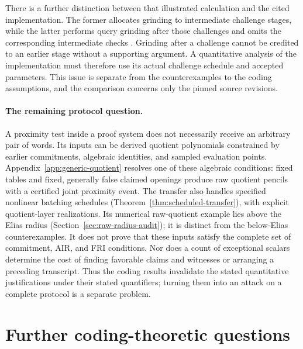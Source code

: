 \documentclass[11pt,letterpaper]{article}
\theoremstyle{definition}
\theoremstyle{remark}
\begin{document}
There is a further distinction between that illustrated calculation
and the cited implementation. The former allocates grinding to
intermediate challenge stages, while the latter performs query grinding
after those challenges and omits the corresponding intermediate checks
\cite{stwo-grinding}. Grinding after a challenge cannot be credited to
an earlier stage without a supporting argument. A quantitative analysis
of the implementation must therefore use its actual challenge schedule
and accepted parameters. This issue is separate from the counterexamples
to the coding assumptions, and the comparison concerns only the pinned
source revisions.

\paragraph{The remaining protocol question.}
A proximity test inside a proof system does not necessarily receive
an arbitrary pair of words. Its inputs can be derived quotient
polynomials constrained by earlier commitments, algebraic identities,
and sampled evaluation points. Appendix~\ref{app:generic-quotient} resolves one of these algebraic
conditions: fixed tables and fixed, generally false claimed openings
produce raw quotient pencils with a certified joint proximity event.
The transfer also handles specified nonlinear batching schedules
(Theorem~\ref{thm:scheduled-transfer}), with explicit quotient-layer
realizations. Its numerical raw-quotient example lies above the Elias
radius (Section~\ref{sec:raw-radius-audit}); it is distinct from the
below-Elias counterexamples. It does not prove that these inputs satisfy
the complete set of commitment, AIR, and FRI conditions. Nor does a count of
exceptional scalars determine the cost of finding favorable claims and witnesses
or arranging a preceding transcript.
Thus the coding results invalidate the stated quantitative
justifications under their stated quantifiers; turning them into an
attack on a complete protocol is a separate problem.

\section{Further coding-theoretic questions}
\label{sec:coding-open-questions}
\end{document}
